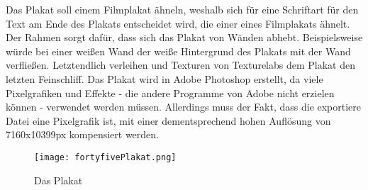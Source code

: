 Das
Plakat soll einem Filmplakat ähneln, weshalb sich für eine Schriftart für den Text am Ende des Plakats entscheidet wird, die einer eines Filmplakats ähnelt. Der Rahmen sorgt dafür, dass sich das Plakat von Wänden abhebt. Beispielsweise würde bei einer weißen Wand der weiße Hintergrund des Plakats mit der Wand verfließen. Letztendlich verleihen
 und  Texturen von Texturelabs dem Plakat den letzten Feinschliff. Das Plakat wird in Adobe Photoshop erstellt, da viele Pixelgrafiken und Effekte - die andere Programme von Adobe nicht erzielen können - verwendet werden müssen. Allerdings muss der Fakt, dass die exportiere Datei eine Pixelgrafik ist, mit einer dementsprechend hohen Auflösung von 7160x10399px kompensiert werden.

\begin{figure}[H]
    \centering
    \texttt{[image: fortyfivePlakat.png]}
    \caption{Das \FF Plakat}
\end{figure}

\renewcommand{\kapitelautor}{}
